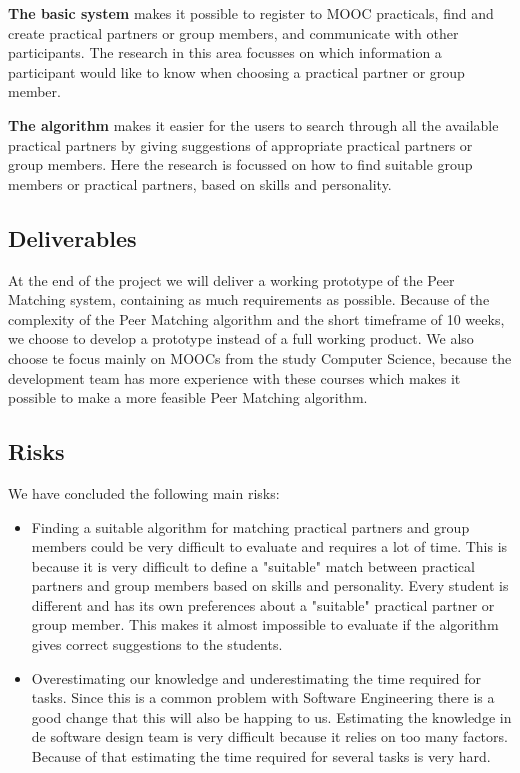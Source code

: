 \documentclass[]{article}
\begin{document}
\textbf{The basic system} makes it possible to register to MOOC practicals, find and create practical partners or group members, and communicate with other participants.
The research in this area focusses on which information a participant would like to know when choosing a practical partner or group member.

\textbf{The algorithm} makes it easier for the users to search through all the available practical partners by giving suggestions of appropriate practical partners or group members.
Here the research is focussed on how to find suitable group members or practical partners, based on skills and personality.

\subsection{Deliverables}
At the end of the project we will deliver a working prototype of the Peer Matching system, containing as much requirements as possible.
Because of the complexity of the Peer Matching algorithm and the short timeframe of 10 weeks, we choose to develop a prototype instead of a full working product.
We also choose te focus mainly on MOOCs from the study Computer Science, because the development team has more experience with these courses which makes it possible to make a more feasible Peer Matching algorithm.

\subsection{Risks}
We have concluded the following main risks:

\begin{itemize}
\item Finding a suitable algorithm for matching practical partners and group members could be very difficult to evaluate and requires a lot of time.
This is because it is very difficult to define a "suitable" match between practical partners and group members based on skills and personality.
Every student is different and has its own preferences about a "suitable" practical partner or group member.
This makes it almost impossible to evaluate if the algorithm gives correct suggestions to the students.

\item Overestimating our knowledge and underestimating the time required for tasks.
Since this is a common problem with Software Engineering there is a good change that this will also be happing to us.
Estimating the knowledge in de software design team is very difficult because it relies on too many factors.
Because of that estimating the time required for several tasks is very hard.
\end{itemize}
\end{document}
